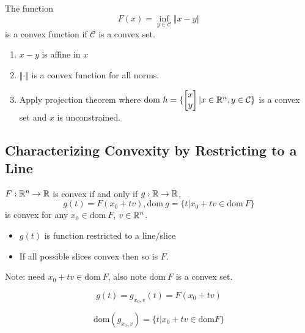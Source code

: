 \begin{example}
The function
\begin{equation*}
F(x) = \inf_{y\in\mathcal{C}}\Vert x-y\Vert
\end{equation*}
is a convex function if $\mathcal{C}$ is a convex set. 

\begin{enumerate}
	\item $x-y$ is affine in $x$
	
	\item $\Vert\cdot\Vert$ is a convex function for all norms.
	
	\item Apply projection theorem where $\text{dom}\ h = \{\begin{bmatrix}
	x\\
	y
	\end{bmatrix}\vert x\in \mathbb{R}^n, y\in \mathcal{C} \}$ is a convex set and $x$ is unconstrained. 
\end{enumerate}
\end{example}


\subsection{Characterizing Convexity by Restricting to a Line}

\begin{theorem} $F: \mathbb{R}^n \rightarrow \mathbb{R}$ is convex if and only if $g:\mathbb{R} \rightarrow \mathbb{R}$,
	$$g(t) =F(x_0 + tv), \text{dom}\ g = \{t| x_0 + tv \in \text{dom}\ F\}$$
	is convex for any $x_0\in\text{dom}\ F$, $v\in\mathbb{R}^{n}$.
\end{theorem}
\begin{itemize}
	\item $g(t)$ is function restricted to a line/slice
	
	\item If all possible slices convex then so is $F$.
\end{itemize}

Note: need $x_0+tv\in \text{dom}\ F$, also note $\text{dom}\ F$ is a convex set. 

\begin{equation*}
g(t) = g_{x_0, v}(t) = F(x_0+tv)
\end{equation*}

\begin{equation*}
\text{dom}(g_{x_0, v}) = \{t|x_0+tv \in \text{dom}F \}
\end{equation*}

